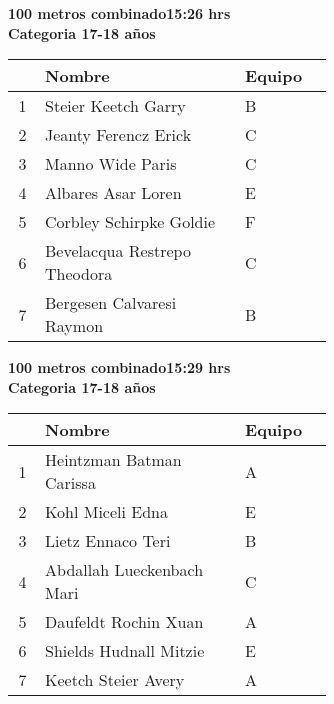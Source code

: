 \begin{minipage}{0.95\linewidth}\vspace{0.5cm} 
\begin{flushleft}
\textbf{
\hspace{-0.15cm}100 metros combinado\hspace{1.5cm}15:26 hrs \\Categoria 17-18 años}\vspace{-0.2cm} 
\end{flushleft}
\begin{tabular}{cp{0.63\linewidth}l}
\hline
& \textbf{Nombre} & \textbf{Equipo} \\ \hline
1 & Steier Keetch Garry & B \\ 
2 & Jeanty Ferencz Erick & C \\ 
3 & Manno Wide Paris & C \\ 
4 & Albares Asar Loren & E \\ 
5 & Corbley Schirpke Goldie & F \\ 
6 & Bevelacqua Restrepo Theodora & C \\ 
7 & Bergesen Calvaresi Raymon & B \\ 
\end{tabular}
\end{minipage}
\begin{minipage}{0.95\linewidth}\vspace{0.5cm} 
\begin{flushleft}
\textbf{
\hspace{-0.15cm}100 metros combinado\hspace{1.5cm}15:29 hrs \\Categoria 17-18 años}\vspace{-0.2cm} 
\end{flushleft}
\begin{tabular}{cp{0.63\linewidth}l}
\hline
& \textbf{Nombre} & \textbf{Equipo} \\ \hline
1 & Heintzman Batman Carissa & A \\ 
2 & Kohl Miceli Edna & E \\ 
3 & Lietz Ennaco Teri & B \\ 
4 & Abdallah Lueckenbach Mari & C \\ 
5 & Daufeldt Rochin Xuan & A \\ 
6 & Shields Hudnall Mitzie & E \\ 
7 & Keetch Steier Avery & A \\ 
\end{tabular}
\end{minipage}

